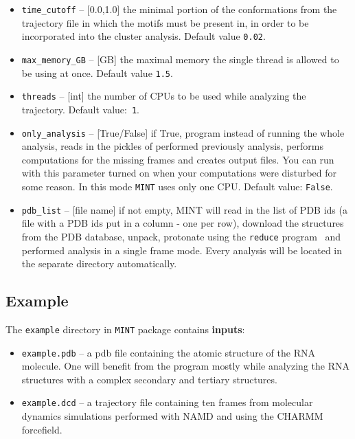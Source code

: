 \documentclass[12pt]{article}
\begin{document}
\begin{itemize}
\item \texttt{time\_cutoff} -- [0.0,1.0] the minimal portion of the conformations from the trajectory file in which the motifs must be present in, in order to be incorporated into the cluster analysis. Default value \texttt{0.02}.
\item \texttt{max\_memory\_GB} -- [GB] the maximal memory the single thread is allowed to be using at once. Default value \texttt{1.5}.
\item \texttt{threads} -- [int] the number of CPUs to be used while analyzing  the trajectory. Default value:~\texttt{1}.
\item \texttt{only\_analysis} -- [True/False] if True, program instead of running the whole analysis, reads in the pickles of performed previously analysis, performs computations for the missing frames and creates output files. You can run with this parameter turned on when your computations were disturbed for some reason. In this mode {\tt MINT} uses only one CPU. Default value: {\tt False}.
\item \texttt{pdb\_list} -- [file name] if not empty, MINT will read in the list of PDB ids (a file with a PDB ids put in a column - one per row), download the structures from the PDB database, unpack, protonate using the {\tt reduce} program~\cite{Word1999a} and performed analysis in a single frame mode. Every analysis will be located in the separate directory automatically.
\end{itemize}

\subsection{Example} \label{Example_sec}
The {\tt example} directory in {\tt MINT} package contains \textbf{inputs}:
\begin{itemize}
\item \texttt{example.pdb}  -- a pdb file containing the atomic structure of the RNA molecule. One will benefit from the program mostly while analyzing the RNA structures with a complex secondary and tertiary structures.
\item \texttt{example.dcd}  -- a trajectory file containing ten frames from molecular dynamics simulations performed with NAMD \cite{Phillips2005} and using the CHARMM forcefield.
\end{itemize}
\end{document}

